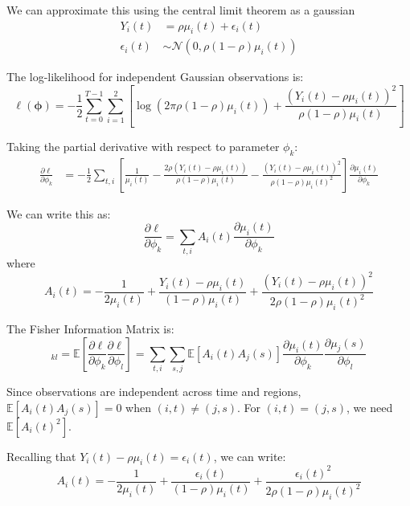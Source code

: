 We can approximate this using the central limit theorem as a gaussian
\begin{align*}
  Y_i(t) &= \rho \mu_i(t) + \epsilon_i(t) \\
  \epsilon_i(t) &\sim \mathcal{N}(0, \rho(1-\rho)\mu_i(t))
\end{align*}

The log-likelihood for independent Gaussian observations is:
\begin{equation*}
\ell(\boldsymbol{\phi}) = -\frac{1}{2}\sum_{t=0}^{T-1}\sum_{i=1}^{2} \left[\log(2\pi \rho(1-\rho)\mu_i(t)) + \frac{(Y_i(t) - \rho\mu_i(t))^2}{\rho(1-\rho)\mu_i(t)}\right]
\end{equation*}

Taking the partial derivative with respect to parameter $\phi_k$:
\begin{align*}
\frac{\partial \ell}{\partial \phi_k} &= -\frac{1}{2}\sum_{t,i} \left[\frac{1}{\mu_i(t)} - \frac{2\rho(Y_i(t) - \rho\mu_i(t))}{\rho(1-\rho)\mu_i(t)} - \frac{(Y_i(t) - \rho\mu_i(t))^2}{\rho(1-\rho)\mu_i(t)^2}\right] \frac{\partial \mu_i(t)}{\partial \phi_k}
\end{align*}

We can write this as:
\begin{equation*}
\frac{\partial \ell}{\partial \phi_k} = \sum_{t,i} A_i(t) \frac{\partial \mu_i(t)}{\partial \phi_k}
\end{equation*}
where
\begin{equation*}
A_i(t) = -\frac{1}{2\mu_i(t)} + \frac{Y_i(t) - \rho\mu_i(t)}{(1-\rho)\mu_i(t)} + \frac{(Y_i(t) - \rho\mu_i(t))^2}{2\rho(1-\rho)\mu_i(t)^2}
\end{equation*}

The Fisher Information Matrix is:
\begin{equation*}
[\mathbf{J}]_{kl} = \mathbb{E}\left[\frac{\partial \ell}{\partial \phi_k}\frac{\partial \ell}{\partial \phi_l}\right] = \sum_{t,i}\sum_{s,j} \mathbb{E}[A_i(t) A_j(s)] \frac{\partial \mu_i(t)}{\partial \phi_k}\frac{\partial \mu_j(s)}{\partial \phi_l}
\end{equation*}

Since observations are independent across time and regions, $\mathbb{E}[A_i(t) A_j(s)] = 0$ when $(i,t) \neq (j,s)$. For $(i,t) = (j,s)$, we need $\mathbb{E}[A_i(t)^2]$.

Recalling that $Y_i(t) - \rho\mu_i(t) = \epsilon_i(t)$, we can write:
\begin{equation*}
A_i(t) = -\frac{1}{2\mu_i(t)} + \frac{\epsilon_i(t)}{(1-\rho)\mu_i(t)} + \frac{\epsilon_i(t)^2}{2\rho(1-\rho)\mu_i(t)^2}
\end{equation*}

